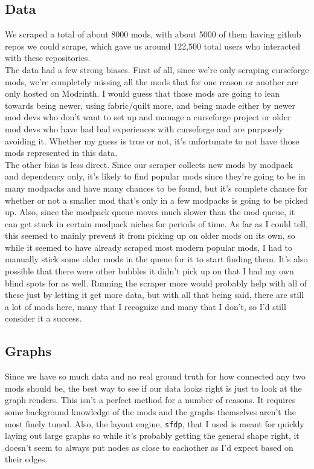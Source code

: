\documentclass[a4paper,11pt, twocolumn]{article}
\begin{document}
\subsection {Data}

We scraped a total of about 8000 mods, with about 5000 of them having github repos we could scrape, which gave us around 122,500 total users who interacted with these repositories.\\

The data had a few strong biases. First of all, since we're only scraping curseforge mods, we're completely missing all the mods that for one reason or another are only hosted on Modrinth. I would guess that those mods are going to lean towards being newer, using fabric/quilt more, and being made either by newer mod devs who don't want to set up and manage a curseforge project or older mod devs who have had bad experiences with curseforge and are purposely avoiding it. Whether my guess is true or not, it's unfortunate to not have those mods represented in this data.\\

The other bias is less direct. Since our scraper collects new mods by modpack and dependency only, it's likely to find popular mods since they're going to be in many modpacks and have many chances to be found, but it's complete chance for whether or not a smaller mod that's only in a few modpacks is going to be picked up. Also, since the modpack queue moves much slower than the mod queue, it can get stuck in certain modpack niches for periods of time. As far as I could tell, this seemed to mainly prevent it from picking up on older mods on its own, so while it seemed to have already scraped most modern popular mods, I had to manually stick some older mods in the queue for it to start finding them. It's also possible that there were other bubbles it didn't pick up on that I had my own blind spots for as well. Running the scraper more would probably help with all of these just by letting it get more data, but with all that being said, there are still a lot of mods here, many that I recognize and many that I don't, so I'd still consider it a success.\\

\subsection{Graphs}

Since we have so much data and no real ground truth for how connected any two mods should be, the best way to see if our data looks right is just to look at the graph renders. This isn't a perfect method for a number of reasons. It requires some background knowledge of the mods and the graphs themselves aren't the most finely tuned. Also, the layout engine, \verb|sfdp|, that I used is meant for quickly laying out large graphs so while it's probably getting the general shape right, it doesn't seem to always put nodes as close to eachother as I'd expect based on their edges.\\
\end{document}
